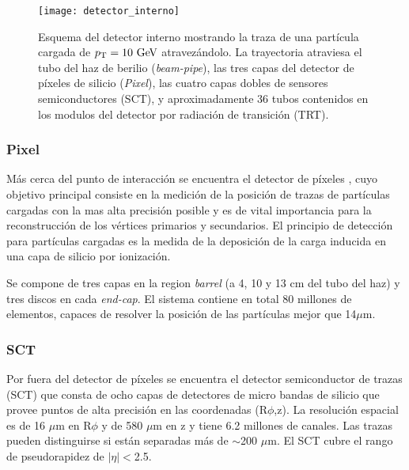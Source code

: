 \begin{figure}[!htbp]
  \centering

  \texttt{[image: detector\_interno]}
  \caption{Esquema del detector interno mostrando la traza de una partícula
    cargada de $\pt = 10\gev$ atravezándolo. La trayectoria atraviesa el
    tubo del haz de berilio (\emph{beam-pipe}), las tres capas del detector de píxeles de silicio (\emph{Pixel}),
    las cuatro capas dobles de sensores semiconductores (SCT), y
    aproximadamente 36 tubos contenidos en los modulos del detector por radiación
  de transición (TRT).}\label{fig:detector_interno}

\end{figure}

\subsubsection{Pixel}

Más cerca del punto de interacción se encuentra el detector de píxeles
\cite{Wermes:381263}, cuyo objetivo principal consiste en la medición de la
posición de trazas de partículas cargadas con la mas alta precisión posible y es
de vital importancia para la reconstrucción de los vértices primarios y
secundarios. El principio de detección para partículas cargadas es la medida de
la deposición de la carga inducida en una capa de silicio por ionización.

Se compone de
tres capas en la region \emph{barrel} (a 4, 10 y 13 cm del tubo del haz) y tres
discos en cada \emph{end-cap}.
El sistema
contiene en total 80 millones de elementos, capaces de resolver la posición de las partículas mejor que 14$\mu$m.


\subsubsection{SCT}

Por fuera del detector de píxeles se encuentra el detector semiconductor de
trazas (SCT) que consta de ocho capas de detectores de micro bandas de silicio
que provee puntos de alta precisión en las coordenadas (R$\phi$,z). La
resolución espacial es de 16 $\mu$m en R$\phi$ y de 580 $\mu$m en z y tiene 6.2
millones de canales. Las trazas pueden distinguirse si están separadas más de
$\sim$200 $ \mu$m. El SCT cubre el rango de pseudorapidez de $|\eta|<$2.5.


